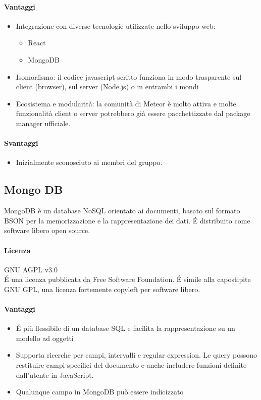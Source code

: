 \paragraph{Vantaggi}
\begin{itemize}
	\item Integrazione con diverse tecnologie utilizzate nello sviluppo web:
	\begin{itemize}
		\item React
		\item MongoDB
	\end{itemize}
	\item Isomorfismo: il codice javascript scritto funziona in modo trasparente sul client (browser), sul server (Node.js) o in entrambi i mondi
	\item Ecosistema e modularità: la comunità di Meteor è molto attiva e molte funzionalità client o server potrebbero già essere pacchettizzate dal package manager ufficiale. 
\end{itemize}

\paragraph{Svantaggi} %
\begin{itemize}
	\item Inizialmente sconosciuto ai membri del gruppo.
\end{itemize}

\subsection{Mongo DB}
MongoDB è un database NoSQL orientato ai documenti, basato sul formato BSON per la memorizzazione e la rappresentazione dei dati. \'E distribuito come software libero open source. \\

\paragraph{Licenza} GNU AGPL v3.0 \\
\'E una licenza pubblicata da Free Software Foundation. \'E simile alla capostipite GNU GPL, una licenza fortemente copyleft per software libero.

\paragraph{Vantaggi}
\begin{itemize}
	\item \'E più flessibile di un database SQL e facilita la rappresentazione su un modello ad
	oggetti
	\item Supporta ricerche per campi, intervalli e regular expression. Le query possono restituire campi specifici del documento e anche includere funzioni definite dall'utente in JavaScript.
	\item Qualunque campo in MongoDB può essere indicizzato 
\end{itemize}


